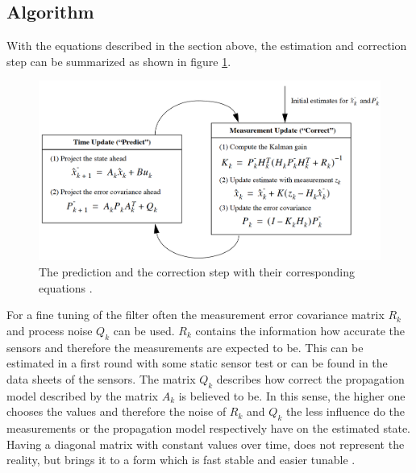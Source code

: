 \subsection*{Algorithm}
With the equations described in the section above, the estimation and correction step can be summarized as shown in figure \ref{equation_kalman}.
\begin{figure}[h]
\begin{center}
\includegraphics[width=13cm]{pictures/equation_kalman.png}
\caption{The prediction and the correction step with their corresponding equations \cite{welch1997}. }
\label{equation_kalman}
\end{center}
\end{figure} 
For a fine tuning of the filter often the measurement error covariance matrix $R_k$ and process noise $Q_k$ can be used. $R_k$ contains the information how accurate the sensors and therefore the measurements are expected to be. This can be estimated in a first round with some static sensor test or can be found in the data sheets of the sensors. The matrix $Q_k$ describes how correct the propagation model described by the matrix $A_k$ is believed to be. In this sense, the higher one chooses the values and therefore the noise of $R_k$ and $Q_k$ the less influence do the measurements or the propagation model respectively have on the estimated state. Having a diagonal matrix with constant values over time, does not represent the reality, but brings it to a form which is fast stable and easier tunable \cite{welch1997}. 

